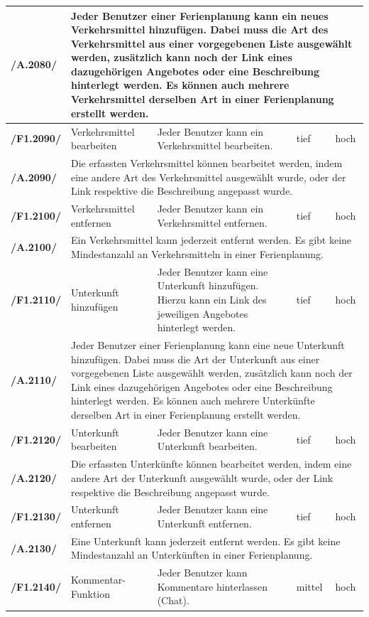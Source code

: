 \documentclass[10pt,a4paper,titlepage,twoside,german,final]{zhawreprt}
\newcommand{\AddRequirement}[2]{
\textbf{/#1#2/}
}
\newcommand{\F}[1]{
\AddRequirement{F1.}{#1}
}
\newcommand{\A}[1]{
\AddRequirement{A.}{#1}
}
\numberwithin{table}{chapter}
\begin{document}
\begin{center}
\begin{longtable}{l|p{2.5cm}|p{5cm}|p{2cm}|p{1.5cm}}
\A{2080}&\multicolumn{4}{p{10cm}|}{
Jeder Benutzer einer Ferienplanung kann ein neues Verkehrsmittel hinzufügen. Dabei muss die Art des Verkehrsmittel aus einer vorgegebenen Liste ausgewählt werden, zusätzlich kann noch der Link eines dazugehörigen Angebotes oder eine Beschreibung hinterlegt werden. Es können auch mehrere Verkehrsmittel derselben Art in einer Ferienplanung erstellt werden.}\\\hline
\F{2090} & Verkehrsmittel bearbeiten & Jeder Benutzer kann ein Verkehrsmittel bearbeiten. & tief & hoch\\\hline
\A{2090}&\multicolumn{4}{p{10cm}|}{
Die erfassten Verkehrsmittel können bearbeitet werden, indem eine andere Art des Verkehrsmittel ausgewählt wurde, oder der Link respektive die Beschreibung angepasst wurde.}\\\hline
\F{2100} & Verkehrsmittel entfernen & Jeder Benutzer kann ein Verkehrsmittel entfernen. & tief & hoch\\\hline
\A{2100}&\multicolumn{4}{p{10cm}|}{
Ein Verkehrsmittel kann jederzeit entfernt werden. Es gibt keine Mindestanzahl an Verkehrsmitteln in einer Ferienplanung.}\\\hline
\F{2110} & Unterkunft hinzufügen & Jeder Benutzer kann eine Unterkunft hinzufügen. Hierzu kann ein Link des jeweiligen Angebotes hinterlegt werden. & tief & hoch\\\hline
\A{2110}&\multicolumn{4}{p{10cm}|}{
Jeder Benutzer einer Ferienplanung kann eine neue Unterkunft hinzufügen. Dabei muss die Art der Unterkunft aus einer vorgegebenen Liste ausgewählt werden, zusätzlich kann noch der Link eines dazugehörigen Angebotes oder eine Beschreibung hinterlegt werden. Es können auch mehrere Unterkünfte derselben Art in einer Ferienplanung erstellt werden.}\\\hline
\F{2120} & Unterkunft bearbeiten & Jeder Benutzer kann eine Unterkunft bearbeiten. & tief & hoch\\\hline
\A{2120}&\multicolumn{4}{p{10cm}|}{
Die erfassten Unterkünfte können bearbeitet werden, indem eine andere Art der Unterkunft ausgewählt wurde, oder der Link respektive die Beschreibung angepasst wurde.}\\\hline
\F{2130} & Unterkunft entfernen & Jeder Benutzer kann eine Unterkunft entfernen. & tief & hoch\\\hline
\A{2130}&\multicolumn{4}{p{10cm}|}{
Eine Unterkunft kann jederzeit entfernt werden. Es gibt keine Mindestanzahl an Unterkünften in einer Ferienplanung.}\\\hline
\F{2140} & Kommentar-Funktion & Jeder Benutzer kann Kommentare hinterlassen (Chat). & mittel & hoch\\\hline

\end{longtable}
\end{center}
\end{document}
